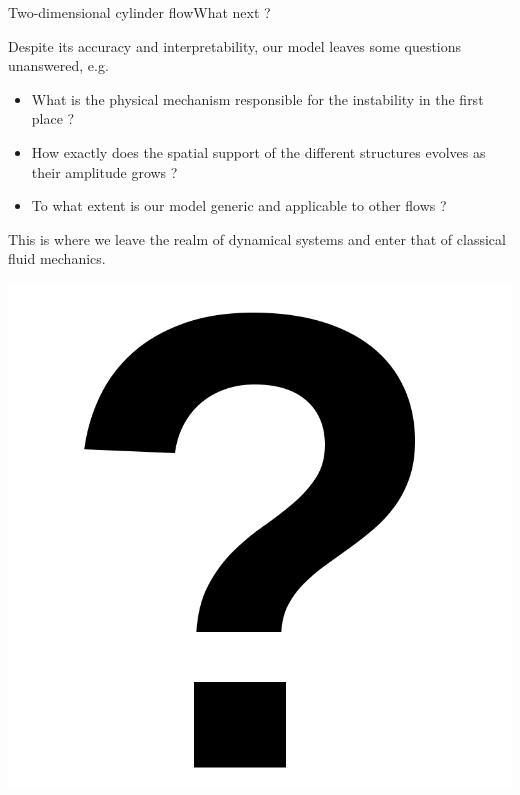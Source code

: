 \documentclass[usenames,dvipsnames,svgnames,10pt,aspectratio=169]{beamer}
\begin{document}
\begin{frame}[t, c]{Two-dimensional cylinder flow}{What next ?}
  \begin{minipage}{.68\textwidth}
    Despite its accuracy and interpretability, our model leaves some questions unanswered, e.g.

    \medskip

    \begin{itemize}
    \item What is the physical mechanism responsible for the instability in the first place ?
    \item How exactly does the spatial support of the different structures evolves as their amplitude grows ?
    \item To what extent is our model generic and applicable to other flows ?
    \end{itemize}

    \medskip

    This is where we leave the realm of dynamical systems and enter that of classical fluid mechanics.

  \end{minipage}%
  \hfill
  \begin{minipage}{.28\textwidth}
    \centering
    \includegraphics[width=\textwidth]{question}
  \end{minipage}
\end{frame}
\end{document}
